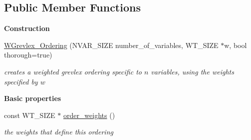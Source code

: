 \subsection*{Public Member Functions}
\begin{Indent}{\bf Construction}\par
\begin{DoxyCompactItemize}
\item 
\hyperlink{class_w_grevlex___ordering_a41ebfd179da2b7bceac1da5cf13d7c8c}{W\+Grevlex\+\_\+\+Ordering} (N\+V\+A\+R\+\_\+\+S\+I\+ZE number\+\_\+of\+\_\+variables, W\+T\+\_\+\+S\+I\+ZE $\ast$w, bool thorough=true)
\begin{DoxyCompactList}\small\item\em creates a weighted grevlex ordering specific to $n$ variables, using the weights specified by $w$ \end{DoxyCompactList}\end{DoxyCompactItemize}
\end{Indent}
\begin{Indent}{\bf Basic properties}\par
\begin{DoxyCompactItemize}
\item 
const W\+T\+\_\+\+S\+I\+ZE $\ast$ \hyperlink{class_w_grevlex___ordering_af44191fe804b86c77b698945c89e88a5}{order\+\_\+weights} ()\hypertarget{class_w_grevlex___ordering_af44191fe804b86c77b698945c89e88a5}{}\label{class_w_grevlex___ordering_af44191fe804b86c77b698945c89e88a5}

\begin{DoxyCompactList}\small\item\em the weights that define this ordering \end{DoxyCompactList}\end{DoxyCompactItemize}
\end{Indent}
